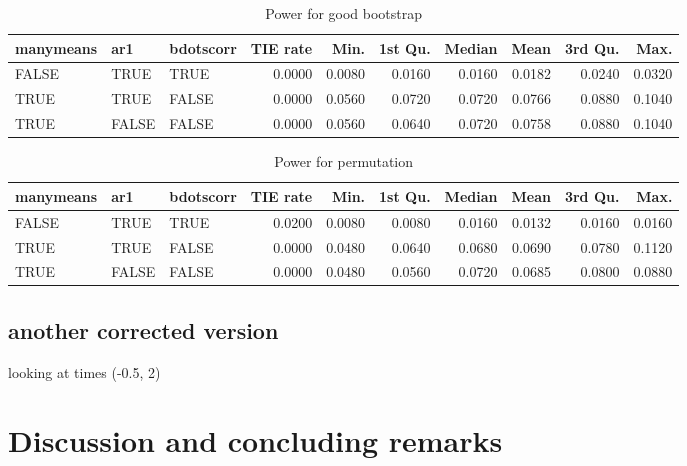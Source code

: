 \documentclass{article}
\begin{document}
\begin{table}[H]
\centering
\begin{tabular}{lllrrrrrrr}
  \hline
manymeans & ar1 & bdotscorr & TIE rate & Min. & 1st Qu. & Median & Mean & 3rd Qu. & Max. \\ 
  \hline
FALSE & TRUE & TRUE & 0.0000 & 0.0080 & 0.0160 & 0.0160 & 0.0182 & 0.0240 & 0.0320 \\ 
  TRUE & TRUE & FALSE & 0.0000 & 0.0560 & 0.0720 & 0.0720 & 0.0766 & 0.0880 & 0.1040 \\ 
  TRUE & FALSE & FALSE & 0.0000 & 0.0560 & 0.0640 & 0.0720 & 0.0758 & 0.0880 & 0.1040 \\ 
   \hline
\end{tabular}
\caption{Power for good bootstrap} 
\label{tab:good_boot_pwr2}
\end{table}

\begin{table}[H]
\centering
\begin{tabular}{lllrrrrrrr}
  \hline
manymeans & ar1 & bdotscorr & TIE rate & Min. & 1st Qu. & Median & Mean & 3rd Qu. & Max. \\ 
  \hline
FALSE & TRUE & TRUE & 0.0200 & 0.0080 & 0.0080 & 0.0160 & 0.0132 & 0.0160 & 0.0160 \\ 
  TRUE & TRUE & FALSE & 0.0000 & 0.0480 & 0.0640 & 0.0680 & 0.0690 & 0.0780 & 0.1120 \\ 
  TRUE & FALSE & FALSE & 0.0000 & 0.0480 & 0.0560 & 0.0720 & 0.0685 & 0.0800 & 0.0880 \\ 
   \hline
\end{tabular}
\caption{Power for permutation} 
\label{tab:perm_pwr2}
\end{table}


\subsection{another corrected version}

looking at times (-0.5, 2)

\section{Discussion and concluding remarks}

\end{document}

